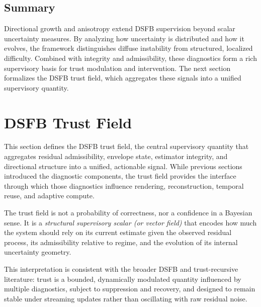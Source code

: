 \documentclass[11pt]{article}
\theoremstyle{definition}
\theoremstyle{plain}
\begin{document}

\subsection{Summary}

Directional growth and anisotropy extend DSFB supervision beyond scalar uncertainty measures. By analyzing how uncertainty is distributed and how it evolves, the framework distinguishes diffuse instability from structured, localized difficulty. Combined with integrity and admissibility, these diagnostics form a rich supervisory basis for trust modulation and intervention. The next section formalizes the DSFB trust field, which aggregates these signals into a unified supervisory quantity.





\section{DSFB Trust Field}
\label{sec:trustfield}

This section defines the DSFB trust field, the central supervisory quantity that aggregates residual admissibility, envelope state, estimator integrity, and directional structure into a unified, actionable signal. While previous sections introduced the diagnostic components, the trust field provides the interface through which those diagnostics influence rendering, reconstruction, temporal reuse, and adaptive compute.

The trust field is not a probability of correctness, nor a confidence in a Bayesian sense. It is a \emph{structural supervisory scalar (or vector field)} that encodes how much the system should rely on its current estimate given the observed residual process, its admissibility relative to regime, and the evolution of its internal uncertainty geometry.

This interpretation is consistent with the broader DSFB and trust-recursive literature: trust is a bounded, dynamically modulated quantity influenced by multiple diagnostics, subject to suppression and recovery, and designed to remain stable under streaming updates rather than oscillating with raw residual noise. 

\end{document}

